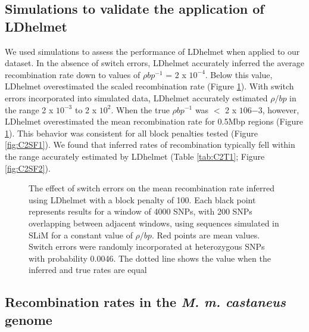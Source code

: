 \subsection{Simulations to validate the application of LDhelmet}

We used simulations to assess the performance of LDhelmet when applied to our dataset. In the absence of switch errors, LDhelmet accurately inferred the average recombination rate down to values of $\rho bp^{-1}$ = 2 x $10^{-4}$. Below this value, LDhelmet overestimated the scaled recombination rate (Figure \ref{fig:C2F1}). With switch errors incorporated into simulated data, LDhelmet accurately estimated $\rho /bp$ in the range 2 x $10^{-3}$ to 2 x $10^2$. When the true $\rho bp^{-1}$ was $<$ 2 x $106{-3}$, however, LDhelmet overestimated the mean recombination rate for 0.5Mbp regions (Figure \ref{fig:C2F1}). This behavior was consistent for all block penalties tested (Figure \ref{fig:C2SF1}). We found that inferred rates of recombination typically fell within the range accurately estimated by LDhelmet (Table \ref{tab:C2T1}; Figure \ref{fig:C2SF2}).
 
  \begin{figure}[h]
   \centering      
   \noindent{}
 \caption[The effect of switch errors on recombination rate inference]{The effect of switch errors on the mean recombination rate inferred using LDhelmet with a block penalty of 100. Each black point represents results for a window of 4000 SNPs, with 200 SNPs overlapping between adjacent windows, using sequences simulated in SLiM for a constant value of $\rho/bp$. Red points are mean values. Switch errors were randomly incorporated at heterozygous SNPs with probability 0.0046. The dotted line shows the value when the inferred and true rates are equal}
\label{fig:C2F1}
\end{figure}

\subsection{Recombination rates in the \textit{\textit{M. m. castaneus}} genome}
 
